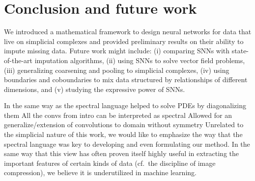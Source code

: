 \section{Conclusion and future work}

We introduced a mathematical framework to design neural networks for data that live on simplicial complexes and provided preliminary results on their ability to impute missing data.
Future work might include:
(i) comparing SNNs with state-of-the-art imputation algorithms,
(ii) using SNNs to solve vector field problems,
(iii) generalizing coarsening and pooling to simplicial complexes,
(iv) using boundaries and coboundaries to mix data structured by relationships of different dimensions,
and (v) studying the expressive power of SNNs.

In the same way as the spectral language helped to solve PDEs by diagonalizing them
All the convs from intro can be interpreted as spectral
Allowed for an generalize/extension of convolutions to domain without symmetry
Unrelated to the simplicial nature of this work, we would like to emphasize the way that the spectral language was key to developing and even formulating our method. In the same way that this view has often proven itself highly useful in extracting the important features of certain kinds of data (cf.\ the discipline of image compression), we believe it is underutilized in machine learning.
